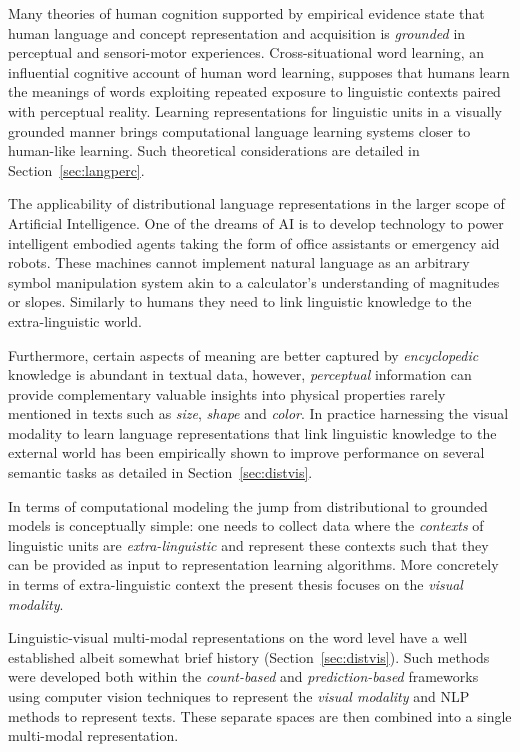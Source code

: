 Many theories of human cognition supported by empirical
evidence state that human language and concept representation and acquisition is \emph{grounded}
in perceptual and sensori-motor experiences. Cross-situational word learning,
an influential cognitive account of human word learning, supposes that humans learn the
meanings of words exploiting repeated exposure to linguistic contexts paired with perceptual reality.
Learning representations for linguistic units in a visually grounded manner brings
computational language learning systems closer to human-like learning.
Such theoretical considerations are detailed in Section~\ref{sec:langperc}.

The applicability of distributional language representations in the larger scope of Artificial
Intelligence. One of the dreams of AI is to develop technology to power intelligent embodied agents
taking the form of office assistants or emergency aid robots. These machines cannot implement natural
language as an arbitrary symbol manipulation system akin to a calculator's understanding of
magnitudes or slopes.
Similarly to humans they need to link linguistic knowledge to the extra-linguistic world.

Furthermore, certain aspects of meaning are better captured by \emph{encyclopedic}
knowledge is abundant in textual data, however, \emph{perceptual} information
can provide complementary valuable insights into physical properties rarely mentioned 
in texts such as \emph{size}, \emph{shape} and \emph{color}. 
In practice harnessing the visual modality to learn language
representations that link linguistic knowledge
to the external world  has been empirically shown to improve performance on several semantic tasks as
detailed in Section~\ref{sec:distvis}.


In terms of computational modeling the jump from
distributional to grounded models is conceptually simple: one needs to collect data where
the \emph{contexts} of linguistic units are \emph{extra-linguistic} and represent these contexts such
that they can be provided as input to representation learning algorithms.
More concretely in terms of extra-linguistic context the present thesis focuses on the \emph{visual modality}.

Linguistic-visual multi-modal representations on the word level have a well established albeit
somewhat brief history (Section~\ref{sec:distvis}).
Such methods were developed both within the \emph{count-based}
and \emph{prediction-based} frameworks using computer vision techniques to represent the
\emph{visual modality} and NLP methods to represent texts.
These separate spaces are then combined into a single multi-modal representation.

